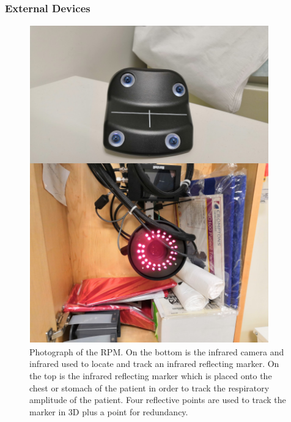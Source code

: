             \subsubsection{External Devices} \label{sec:external_devices}
                \begin{figure}
                    \centering
                        
                    \includegraphics[width=1.0\linewidth]{figures/background_rpm.png}
                        
                    \captionsetup{singlelinecheck=false, justification=raggedright}
                    \caption{Photograph of the \gls{RPM}. On the bottom is the infrared camera and infrared  used to locate and track an infrared reflecting marker. On the top is the infrared reflecting marker which is placed onto the chest or stomach of the patient in order to track the respiratory amplitude of the patient. Four reflective points are used to track the marker in \gls{3D} plus a point for redundancy.} \label{fig:external_devices_rpm}
                \end{figure}
                
